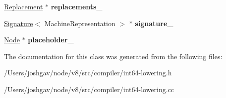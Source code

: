 \begin{DoxyCompactItemize}
\item 
\hyperlink{structv8_1_1internal_1_1compiler_1_1_int64_lowering_1_1_replacement}{Replacement} $\ast$ {\bfseries replacements\+\_\+}\hypertarget{classv8_1_1internal_1_1compiler_1_1_int64_lowering_abc4e01ba592a93e3999a43134679716d}{}\label{classv8_1_1internal_1_1compiler_1_1_int64_lowering_abc4e01ba592a93e3999a43134679716d}

\item 
\hyperlink{classv8_1_1internal_1_1_signature}{Signature}$<$ Machine\+Representation $>$ $\ast$ {\bfseries signature\+\_\+}\hypertarget{classv8_1_1internal_1_1compiler_1_1_int64_lowering_a1e0ca97860bdd322cacebee7f2ee39cf}{}\label{classv8_1_1internal_1_1compiler_1_1_int64_lowering_a1e0ca97860bdd322cacebee7f2ee39cf}

\item 
\hyperlink{classv8_1_1internal_1_1compiler_1_1_node}{Node} $\ast$ {\bfseries placeholder\+\_\+}\hypertarget{classv8_1_1internal_1_1compiler_1_1_int64_lowering_ab18fd5bab4e002bc04c2f23c73d915b1}{}\label{classv8_1_1internal_1_1compiler_1_1_int64_lowering_ab18fd5bab4e002bc04c2f23c73d915b1}

\end{DoxyCompactItemize}


The documentation for this class was generated from the following files\+:\begin{DoxyCompactItemize}
\item 
/\+Users/joshgav/node/v8/src/compiler/int64-\/lowering.\+h\item 
/\+Users/joshgav/node/v8/src/compiler/int64-\/lowering.\+cc\end{DoxyCompactItemize}
